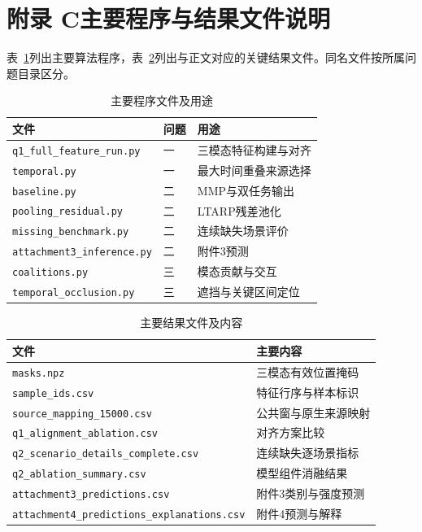 \section*{附录 C\quad 主要程序与结果文件说明}
\begingroup\normalsize\songti
\setcounter{table}{0}
表~\ref{tab:app_c_programs}列出主要算法程序，表~\ref{tab:app_c_results}列出与正文对应的关键结果文件。同名文件按所属问题目录区分。

\begin{table}[H]\centering\normalsize
\caption{主要程序文件及用途}\label{tab:app_c_programs}
\begin{tabularx}{\textwidth}{@{}p{5.5cm}p{1.3cm}>{\raggedright\arraybackslash}X@{}}
\toprule 文件 & 问题 & 用途\\\midrule
\nolinkurl{q1_full_feature_run.py} & 一 & 三模态特征构建与对齐\\
\nolinkurl{temporal.py} & 一 & 最大时间重叠来源选择\\
\nolinkurl{baseline.py} & 二 & MMP与双任务输出\\
\nolinkurl{pooling_residual.py} & 二 & LTARP残差池化\\
\nolinkurl{missing_benchmark.py} & 二 & 连续缺失场景评价\\
\nolinkurl{attachment3_inference.py} & 二 & 附件3预测\\
\nolinkurl{coalitions.py} & 三 & 模态贡献与交互\\
\nolinkurl{temporal_occlusion.py} & 三 & 遮挡与关键区间定位\\
\bottomrule\end{tabularx}\end{table}

\begin{table}[H]\centering\normalsize
\caption{主要结果文件及内容}\label{tab:app_c_results}
\begin{tabularx}{\textwidth}{@{}p{6.6cm}>{\raggedright\arraybackslash}X@{}}
\toprule 文件 & 主要内容\\\midrule
\nolinkurl{masks.npz} & 三模态有效位置掩码\\
\nolinkurl{sample_ids.csv} & 特征行序与样本标识\\
\nolinkurl{source_mapping_15000.csv} & 公共窗与原生来源映射\\
\nolinkurl{q1_alignment_ablation.csv} & 对齐方案比较\\
\nolinkurl{q2_scenario_details_complete.csv} & 连续缺失逐场景指标\\
\nolinkurl{q2_ablation_summary.csv} & 模型组件消融结果\\
\nolinkurl{attachment3_predictions.csv} & 附件3类别与强度预测\\
\nolinkurl{attachment4_predictions_explanations.csv} & 附件4预测与解释\\
\bottomrule\end{tabularx}\end{table}
\FloatBarrier\endgroup
